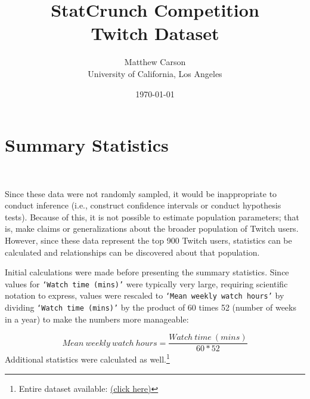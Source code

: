 \documentclass[12pt]{article}
\title{StatCrunch Competition\\ Twitch Dataset}
\author{Matthew Carson\\ University of California, Los Angeles}
\date{\today}
\begin{document}
\begin{titlepage}
\maketitle
\thispagestyle{empty} %
\end{titlepage}
\tableofcontents

\listoftables

\listoffigures
\newpage

\section{Summary Statistics}\

Since these data were not randomly sampled, it would be inappropriate to conduct inference (i.e., construct confidence intervals or conduct hypothesis tests). Because of this, it is not possible to estimate population parameters; that is, make claims or generalizations about the broader population of Twitch users. However, since these data represent the top 900 Twitch users, statistics can be calculated and relationships can be discovered about that population.

Initial calculations were made before presenting the summary statistics. Since values for \texttt{`Watch time (mins)'} were typically very large, requiring scientific notation to express, values were rescaled to \texttt{`Mean weekly watch hours’} by dividing \texttt{`Watch time (mins)'} by the product of 60 times 52 (number of weeks in a year) to make the numbers more manageable:

\begin{equation}
Mean\ weekly\ watch\ hours = \dfrac{Watch\ time\ (mins)}{60 \ast 52}
\end{equation}
\newline
Additional statistics were calculated as well.\footnote{Entire dataset available: \href{https://www.statcrunch.com/app/index.html?dataid=4597814&token=OTI3Z8\%2F0N6hSC1KVw9hTXmyjHLnuZvqCMyuxkgn1QRYPhIQfDVLUFClF3Y41ShOi4C\%2BMKL5\%2FHgpBTXKukjWOPGD4pN\%2FCkiobeyKouIjPB7LoPvHOTDN7wUNtPZQd2\%2BNjOwAtSMQl9aKQrbthjCSuuSihsliiTo0MvakPDYN0lwiE8N11ITBSTS9QJH9QgHEmO4ahoV6IkASuVdKosV\%2FJSQ\%3D\%3D}{(click here)}}
\end{document}
